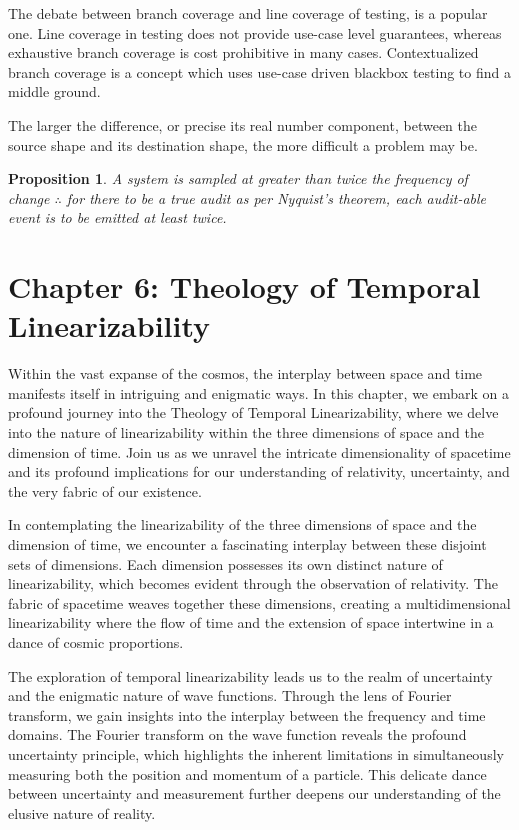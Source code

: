 \documentclass[ebook,12pt,oneside,openany]{memoir}
\newtheorem*{proposition}{Proposition} %
\begin{document}
\indent The debate between branch coverage and line coverage of testing, is a popular one. Line coverage in testing does not provide use-case level guarantees, whereas exhaustive branch coverage is cost prohibitive in many cases. Contextualized branch coverage is a concept which uses use-case driven blackbox testing to find a middle ground.

\indent The larger the difference, or precise its real number component, between the source shape and its destination shape, the more difficult a problem may be.

\indent \begin{proposition}
A system is sampled at greater than twice the frequency of change $\therefore$ for there to be a true audit as per Nyquist's theorem, each audit-able event is to be emitted at least twice.
\end{proposition}
\chapter*{Chapter 6: Theology of Temporal Linearizability}


\indent \indent Within the vast expanse of the cosmos, the interplay between space and time manifests itself in intriguing and enigmatic ways. In this chapter, we embark on a profound journey into the Theology of Temporal Linearizability, where we delve into the nature of linearizability within the three dimensions of space and the dimension of time. Join us as we unravel the intricate dimensionality of spacetime and its profound implications for our understanding of relativity, uncertainty, and the very fabric of our existence.

\indent In contemplating the linearizability of the three dimensions of space and the dimension of time, we encounter a fascinating interplay between these disjoint sets of dimensions. Each dimension possesses its own distinct nature of linearizability, which becomes evident through the observation of relativity. The fabric of spacetime weaves together these dimensions, creating a multidimensional linearizability where the flow of time and the extension of space intertwine in a dance of cosmic proportions.

\indent The exploration of temporal linearizability leads us to the realm of uncertainty and the enigmatic nature of wave functions. Through the lens of Fourier transform, we gain insights into the interplay between the frequency and time domains. The Fourier transform on the wave function reveals the profound uncertainty principle, which highlights the inherent limitations in simultaneously measuring both the position and momentum of a particle. This delicate dance between uncertainty and measurement further deepens our understanding of the elusive nature of reality.
\end{document}
